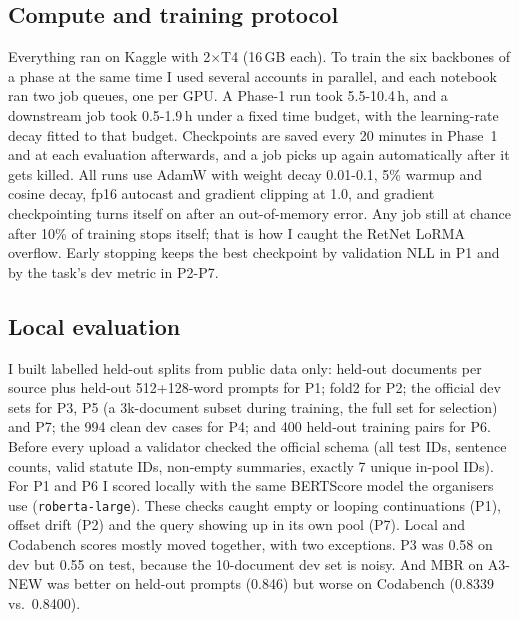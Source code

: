 \documentclass[11pt, oneside]{article}
\begin{document}
\subsection{Compute and training protocol}
Everything ran on Kaggle with 2$\times$T4 (16\,GB each). To train the six
backbones of a phase at the same time I used several accounts in parallel, and
each notebook ran two job queues, one per GPU. A Phase-1 run took 5.5-10.4\,h,
and a downstream job took 0.5-1.9\,h under a fixed time budget, with the
learning-rate decay fitted to that budget. Checkpoints are saved every 20
minutes in Phase~1 and at each evaluation afterwards, and a job picks up again
automatically after it gets killed. All runs use AdamW with weight decay
0.01-0.1, 5\% warmup and cosine decay, fp16 autocast and gradient clipping at
1.0, and gradient checkpointing turns itself on after an out-of-memory error.
Any job still at chance after 10\% of training stops itself; that is how I
caught the RetNet LoRMA overflow. Early stopping keeps the best checkpoint by
validation NLL in P1 and by the task's dev metric in P2-P7.

\subsection{Local evaluation}
I built labelled held-out splits from public data only: held-out documents per
source plus held-out 512+128-word prompts for P1; fold2 for P2; the official
dev sets for P3, P5 (a 3k-document subset during training, the full set for
selection) and P7; the 994 clean dev cases for P4; and 400 held-out training
pairs for P6.
Before every upload a validator checked the official schema (all test IDs, sentence counts, valid statute IDs, non-empty summaries, exactly 7 unique in-pool IDs). For P1 and P6 I scored locally with the same
BERTScore model the organisers use (\texttt{roberta-large}). These checks
caught empty or looping continuations (P1), offset drift (P2) and the query
showing up in its own pool (P7).
Local and Codabench scores mostly moved together, with two exceptions. P3 was
0.58 on dev but 0.55 on test, because the 10-document dev set is noisy. And
MBR on A3-NEW was better on held-out prompts (0.846) but worse on Codabench
(0.8339 vs.\ 0.8400).
\end{document}
